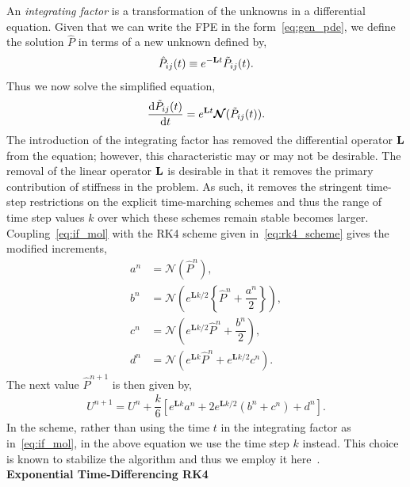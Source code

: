 \documentclass[11pt]{article}
\newcommand{\Phat}{\hat{P}}
\newcommand{\mN}{\bm{\mathcal{N}}}
\begin{document}
An \emph{integrating factor} is a transformation of the unknowns in a differential equation. Given that we can write the FPE in the form~\eqref{eq:gen_pde}, we define the solution $\Phat$ in terms of a new unknown defined by,
\begin{align}
    \Phat_{ij}(t) \equiv e^{-\vb{L}t}\tilde{P}_{ij}(t).
\end{align}
Thus we now solve the simplified equation,
\begin{align}
    \dv{\tilde{P}_{ij}(t)}{t} = e^{\vb{L}t}\mN(\tilde{P}_{ij}(t)). \label{eq:if_mol}
\end{align}
The introduction of the integrating factor has removed the differential operator $\vb{L}$ from the equation; however, this characteristic may or may not be desirable. The removal of the linear operator $\vb{L}$ is desirable in that it removes the primary contribution of stiffness in the problem. As such, it removes the stringent time-step restrictions on the explicit time-marching schemes and thus the range of time step values $k$ over which these schemes remain stable becomes larger. Coupling~\eqref{eq:if_mol} with the RK4 scheme given in~\eqref{eq:rk4_scheme} gives the modified increments,
\begin{subequations}
    \begin{align}
        a^{n} &= \mN\left(\Phat^{n}\right),\\
        b^{n} &= \mN\left(e^{\mathbf{L}k/2}\left\{\Phat^{n}+\dfrac{a^{n}}{2}\right\}\right),\\
        c^{n} &= \mN\left(e^{\mathbf{L}k/2}\Phat^{n} + \dfrac{b^{n}}{2}\right),\\
        d^{n} &= \mN\left(e^{\mathbf{L}k}\Phat^{n} + e^{\mathbf{L}k/2}c^{n}\right).
    \end{align}
\end{subequations}
The next value $\Phat^{n+1}$ is then given by,
\begin{align}
    U^{n+1} = U^{n} + \dfrac{k}{6}\left[e^{\mathbf{L}k}a^{n} + 2e^{\mathbf{L}k/2}\left(b^{n}+c^{n}\right) + d^{n}\right].\label{eq:if_scheme}
\end{align}
In the scheme, rather than using the time $t$ in the integrating factor as in~\eqref{eq:if_mol}, in the above equation we use the time step $k$ instead. This choice is known to stabilize the algorithm and thus we employ it here~\cite{trefethen2000spectral}.  \\

\noindent\textbf{Exponential Time-Differencing RK4}
\end{document}

